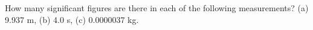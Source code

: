         How many significant figures are there in each of the following measurements?
        (a) 9.937 m, (b) 4.0 s, (c) 0.0000037 kg.

